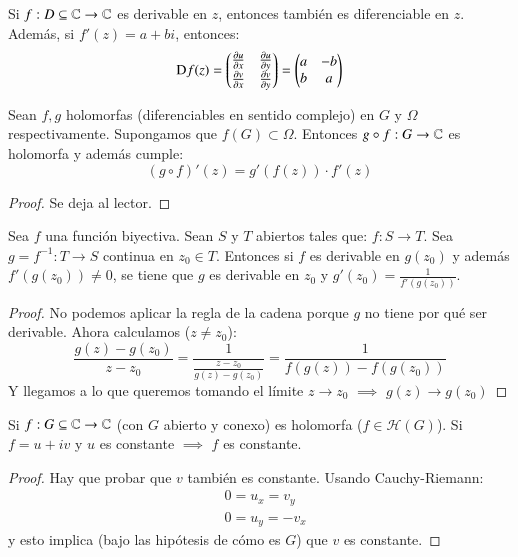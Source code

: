 \begin{obs}
    Si $f: D\subseteq \mathbb{C} \to \mathbb{C}$ es derivable en $z$, entonces también es diferenciable en $z$. Además, si $f'(z) = a+bi$, entonces:
    $$
        \mathrm{D}f(z) = \px{
        \pd{u}{x} & \pd{u}{y}\\
        \pd{v}{x} & \pd{v}{y}
        } = \px{
            a & -b \\
            b & a
        }
    $$
\end{obs}

\begin{pro}
    Sean $f, g$ holomorfas (diferenciables en sentido complejo) en $G$ y $\Omega$ respectivamente. Supongamos que $f(G) \subset \Omega$. Entonces $g\circ f: G \to \mathbb{C}$ es holomorfa y además cumple:
    $$
        (g \circ f)'(z) = g'(f(z)) \cdot f'(z)
    $$
\end{pro}
\begin{proof}
    Se deja al lector.
\end{proof}

\begin{pro}
    Sea $f$ una función biyectiva. Sean $S$ y $T$ abiertos tales que: $f: S \to T$. Sea $g = f^{-1}: T \to S$ continua en $z_0 \in T$. Entonces si $f$ es derivable en $g(z_0)$ y además $f'(g(z_0)) \neq 0$, se tiene que $g$ es derivable en $z_0$ y $g'(z_0) = \frac{1}{f'(g(z_0))}$.
\end{pro}

\begin{proof}
    No podemos aplicar la regla de la cadena porque $g$ no tiene por qué ser derivable. Ahora calculamos ($z \neq z_0$):
    $$
        \frac{g(z) - g(z_0)}{z - z_0} = \frac{1}{ \frac{z-z_0}{g(z) - g(z_0)} } = \frac{1}{f(g(z)) - f(g(z_0))}
    $$
    Y llegamos a lo que queremos tomando el límite $z \to z_0$ $\implies$ $g(z) \to g(z_0)$
\end{proof}

\begin{pro}
    Si $f: G \subseteq \mathbb{C} \to \mathbb{C}$ (con $G$ abierto y conexo) es holomorfa ($f \in \mathcal{H}(G)$). Si $f = u + iv$ y $u$ es constante $\implies$ $f$ es constante.
\end{pro}

\begin{proof}
    Hay que probar que $v$ también es constante. Usando Cauchy-Riemann:
    \begin{align*}
        &0 = u_x = v_y\\
        &0 = u_y = -v_x
    \end{align*}
    y esto implica (bajo las hipótesis de cómo es $G$) que $v$ es constante.
\end{proof}


